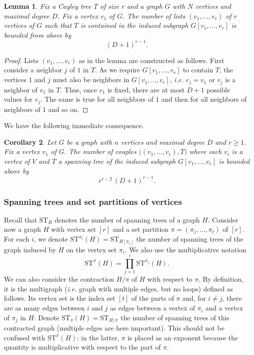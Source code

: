 \documentclass[12pt,a4paper,reqno]{amsart}
\newtheorem{lemma}{Lemma}[section]
\newtheorem{corollary}[lemma]{Corollary}
\theoremstyle{remark}
\newcommand{\ST}{\mathrm{ST}}
\begin{document}
\begin{lemma}
    Fix a Cayley tree $T$ of size $r$ and a graph $G$ with $N$ vertices and maximal degree $D$.
    Fix a vertex $v_1$ of $G$.
    The number of lists $(v_1,\dots,v_r)$ of $r$ vertices of $G$
    such that $T$ is contained in the induced subgraph $G[v_1,\dots,v_r]$ is bounded from above by
    \[ (D+1)^{r-1}. \]
\end{lemma}

\begin{proof}
    Lists $(v_1,\dots,v_r)$ as in the lemma are constructed as follows. First consider a neighbor $j$ of $1$ in $T$. As we require $G[v_1,\dots,v_r]$ to contain $T$, the vertices $1$ and $j$ must also be neighbors in $G[v_1,\dots,v_r]$, {\it i.e.} $v_j=v_1$ or $v_j$ is a neighbor of $v_1$ in $T$. Thus, once $v_1$ is fixed, there are at most $D+1$ possible values for $v_j$. The same is true for all neighbors of $1$ and then for all neighbors of neighbors of $1$ and so on.
\end{proof}
\medskip

We have the following immediate consequence.
\begin{corollary}
    \label{cor:countingcouplessequences_ST}
    Let $G$ be a graph with $n$ vertices and maximal degree $D$ and $r\ge 1$.
    Fix a vertex $v_1$ of $G$.
    The number of couples 
    $\big( (v_1,\dots,v_r), T  \big) $
    where each $v_i$ is a vertex of $V$ and $T$ a spanning tree of
    the induced subgraph $G[v_1,\dots,v_r]$ is bounded above by
    \[r^{r-2} \, (D+1)^{r-1}.\]
\end{corollary}\bigskip

\subsubsection{Spanning trees and set partitions of vertices}
Recall that $\ST_H$ denotes the number of spanning trees of a graph $H$. Consider now a graph $H$ with vertex set $[r]$ and a set partition $\pi=(\pi_1,\dots,\pi_t)$ of $[r]$. For each $i$, we denote $\ST^{\pi_i}(H)=\ST_{H[\pi_i]}$ the number of spanning trees of the graph induced by $H$ on the vertex set $\pi_i$. We also use the multiplicative notation
$$\ST^\pi(H) = \prod_{j=1}^t \ST^{\pi_j}(H).$$
We can also consider the contraction $H/\pi$ of $H$ with respect to $\pi$. By definition, it is the multigraph ({\em i.e.} graph with multiple edges, but no loops) defined as follows. Its vertex set is the index set $[t]$ of the parts of $\pi$ and, for $i \neq j$, there are as many edges between $i$ and $j$ as  edges between a vertex of $\pi_i$ and a vertex of $\pi_j$ in $H$. Denote $\ST_{\pi}(H)=\ST_{H/\pi}$ the number of spanning trees of this contracted graph (multiple edges are here important). This should not be confused with $\ST^\pi(H)$: in the latter, $\pi$ is placed as an exponent because the quantity is multiplicative with respect to the part of $\pi$.
\bigskip
\end{document}
